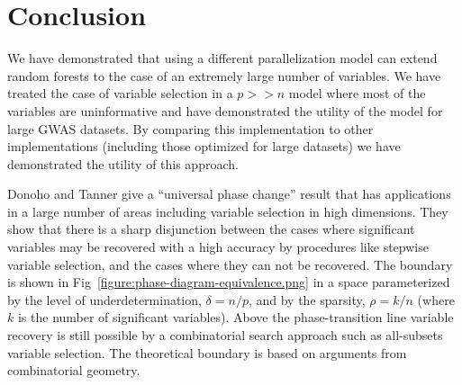 \documentclass[10pt,letterpaper]{article}
\newcommand{\mtry}{\texttt{mtry}\xspace}
\begin{document}




\section{Conclusion}

We have demonstrated that using a different parallelization model can extend random forests to the case of an
extremely large number of variables. We have treated the case of variable selection in a $p >> n$ model where most of
the variables are uninformative and have demonstrated the utility of the model for large GWAS datasets. By comparing
this implementation to other implementations (including those optimized for large datasets) we have demonstrated the
utility of this approach.

Donoho and Tanner \cite{Donoho.and.Tanner.2009} give a ``universal phase change'' result that has applications in a
large number of areas including variable selection in high dimensions. They show that there is a sharp disjunction
between the cases where significant variables may be recovered with a high accuracy by procedures like stepwise variable
selection, and the cases where they can not be recovered. The boundary is shown in
Fig~\ref{figure:phase-diagram-equivalence.png} in a space parameterized by the level of underdetermination,
$\delta = n/p$, and by the sparsity, $\rho =k/n$ (where $k$ is the number of significant variables).  Above the
phase-transition line variable recovery is still possible by a combinatorial search approach such as all-subsets
variable selection.  The theoretical boundary is based on arguments from combinatorial geometry.
\end{document}

